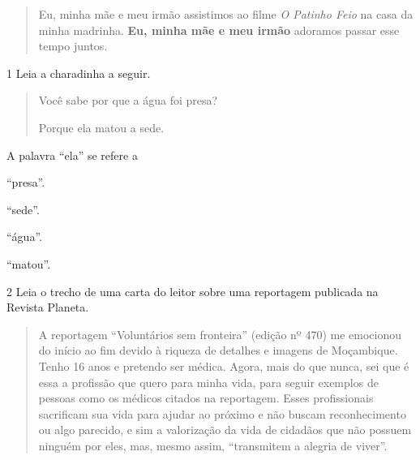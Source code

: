 \begin{quote}
Eu, minha mãe e meu irmão assistimos ao filme \textit{O Patinho Feio} na
casa da minha madrinha. \textbf{Eu, minha mãe e meu irmão} adoramos passar
esse tempo juntos.
\end{quote}



\num{1} Leia a charadinha a seguir.

\begin{quote}
Você sabe por que a água foi presa?

Porque ela matou a sede.
\end{quote}

A palavra ``ela'' se refere a

\begin{escolha}
\item ``presa''.

\item ``sede''.

\item ``água''.

\item ``matou''.
\end{escolha}


\num{2} Leia o trecho de uma carta do leitor sobre uma reportagem
publicada na Revista Planeta.

\begin{quote}
A reportagem ``Voluntários sem fronteira'' (edição nº 470) me emocionou
do início ao fim devido à riqueza de detalhes e imagens de Moçambique.
Tenho 16 anos e pretendo ser médica. Agora, mais do que nunca, sei que é
essa a profissão que quero para minha vida, para seguir exemplos de
pessoas como os médicos citados na reportagem. Esses profissionais
sacrificam sua vida para ajudar ao próximo e não buscam reconhecimento
ou algo parecido, e sim a valorização da vida de cidadãos que não
possuem ninguém por eles, mas, mesmo assim, ``transmitem a alegria de
viver''.

\end{quote}

